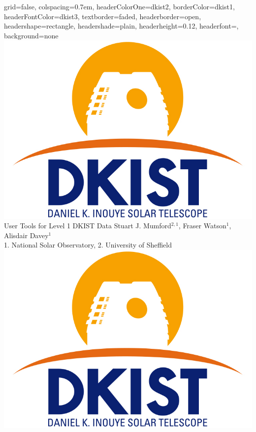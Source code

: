 \documentclass[landscape,a0paper,fontscale=0.32]{baposter}
\begin{document}
\begin{poster}{
 grid=false,
 colspacing=0.7em,
 headerColorOne=dkist2,
 borderColor=dkist1,
 headerFontColor=dkist3,
 textborder=faded,
 headerborder=open,
 headershape=rectangle,
 headershade=plain,
 headerheight=0.12\textheight,
 headerfont={\bfseries},
 background=none
 }
 {
   \includegraphics[height=0.08\textheight]{dkistlogo.jpg}
 }
 {\sc\Huge User Tools for Level 1 DKIST Data}
 {Stuart J. Mumford$^{2,1}$, Fraser Watson$^{1}$, Alisdair Davey$^{1}$\\
 {\footnotesize{1. National Solar Observatory, 2. University of Sheffield}}}
 {
 \includegraphics[height=0.08\textheight]{dkistlogo.jpg}
 }
 


\end{poster}
\end{document}
